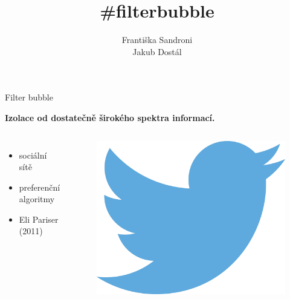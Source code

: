 \documentclass[notheorems,12pt]{beamer}
\title[]{\#filterbubble}
\date{}
\author{Františka Sandroni\\
        Jakub Dostál}
\institute{}
\begin{document}
\maketitle
\begin{frame}{Filter bubble}
    \center
    \vspace{-0.1cm}
    \begin{large}\textbf{Izolace od dostatečně širokého spektra informací.}\end{large}
    \vspace{0.8cm}
    \begin{columns}
    \column{5cm}
    \begin{itemize}
        \item sociální sítě
        \item preferenční algoritmy
        \item Eli Pariser (2011)
    \end{itemize}
    \column{6cm}
        \begin{figure}
            \centering
            \includegraphics[scale=0.4]{./Pics/twitter.png}
        \end{figure}
    \end{columns}
\end{frame}
\end{document}
